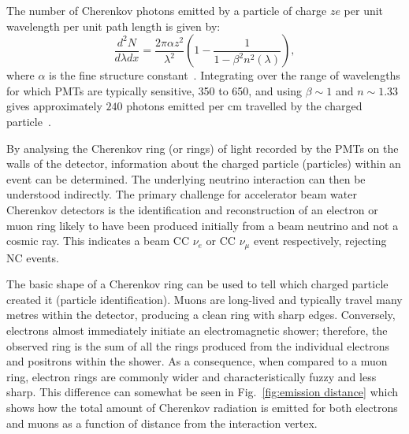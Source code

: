The number of Cherenkov photons emitted by a particle of charge $ze$ per unit wavelength per unit
path length is given by:
\begin{equation}
    \frac{d^{2}N}{d\lambda dx}=\frac{2\pi\alpha z^{2}}{\lambda^{2}}
    \left(1-\frac{1}{1-\beta^{2}n^{2}(\lambda)}\right),
    \label{eq:cherenkov_emission}
\end{equation}
where $\alpha$ is the fine structure constant~\cite{particle2020}. Integrating over the range of
wavelengths for which PMTs are typically sensitive, \unit{350}{} to
\unit{650}{}, and using $\beta\sim 1$ and $n\sim 1.33$ gives approximately $240$
photons emitted per cm travelled by the charged particle~\cite{perch2017}.

By analysing the Cherenkov ring (or rings) of light recorded by the PMTs on the walls of the
detector, information about the charged particle (particles) within an event can be determined.
The underlying neutrino interaction can then be understood indirectly. The primary challenge for
accelerator beam water Cherenkov detectors is the identification and reconstruction of an electron
or muon ring likely to have been produced initially from a beam neutrino and not a cosmic ray.
This indicates a beam CC $\nu_{e}$ or CC $\nu_{\mu}$ event respectively, rejecting NC events.

The basic shape of a Cherenkov ring can be used to tell which charged particle created it
(particle identification). Muons are long-lived and typically travel many metres within the
detector, producing a clean ring with sharp edges. Conversely, electrons almost immediately
initiate an electromagnetic shower; therefore, the observed ring is the sum of all the rings
produced from the individual electrons and positrons within the shower. As a consequence, when
compared to a muon ring, electron rings are commonly wider and characteristically fuzzy and less
sharp. This difference can somewhat be seen in Fig.~\ref{fig:emission distance} which shows how
the total amount of Cherenkov radiation is emitted for both electrons and muons as a function of
distance from the interaction vertex.

